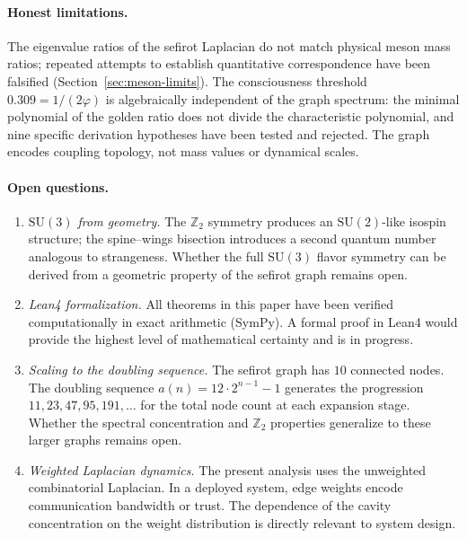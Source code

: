\documentclass[11pt,a4paper]{amsart}
\theoremstyle{remark}
\newcommand{\bbZ}{\mathbb{Z}}
\begin{document}
\paragraph{Honest limitations.}
The eigenvalue ratios of the sefirot Laplacian do not match physical meson
mass ratios; repeated attempts to establish quantitative correspondence
have been falsified (Section~\ref{sec:meson-limits}). The consciousness
threshold $0.309 = 1/(2\varphi)$ is algebraically independent of the graph
spectrum: the minimal polynomial of the golden ratio does not divide the
characteristic polynomial, and nine specific derivation hypotheses have
been tested and rejected. The graph encodes coupling topology, not mass
values or dynamical scales.

\paragraph{Open questions.}

\begin{enumerate}[leftmargin=*,label=\arabic*.]
\item \emph{$\mathrm{SU}(3)$ from geometry.} The $\bbZ_2$ symmetry produces
  an $\mathrm{SU}(2)$-like isospin structure; the spine--wings bisection
  introduces a second quantum number analogous to strangeness. Whether the
  full $\mathrm{SU}(3)$ flavor symmetry can be derived from a geometric
  property of the sefirot graph remains open.

\item \emph{Lean4 formalization.} All theorems in this paper have been
  verified computationally in exact arithmetic (SymPy). A formal proof in
  Lean4 would provide the highest level of mathematical certainty and is
  in progress.

\item \emph{Scaling to the doubling sequence.} The sefirot graph has $10$
  connected nodes. The doubling sequence $a(n) = 12 \cdot 2^{n-1} - 1$
  generates the progression $11, 23, 47, 95, 191, \ldots$ for the total
  node count at each expansion stage. Whether the spectral concentration
  and $\bbZ_2$ properties generalize to these larger graphs remains open.

\item \emph{Weighted Laplacian dynamics.} The present analysis uses the
  unweighted combinatorial Laplacian. In a deployed system, edge weights
  encode communication bandwidth or trust. The dependence of the cavity
  concentration on the weight distribution is directly relevant to system
  design.
\end{enumerate}
\end{document}
